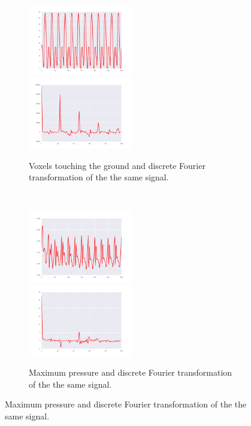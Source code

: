 \documentclass{sig-alternate}
\begin{document}
\begin{figure}[t!]
\begin{subfigure}[t]{0.23\textwidth}
\centering
\includegraphics[width=0.5\textwidth]{../Figures/Behaviors/vtg.pdf}~
\includegraphics[width=0.5\textwidth]{../Figures/Behaviors/vtgdft.pdf}
\caption{Voxels touching the ground and discrete Fourier transformation of the the same signal.}
\end{subfigure}\\
\begin{subfigure}[t]{0.23\textwidth}
\centering
\includegraphics[width=0.5\textwidth]{../Figures/Behaviors/pr.pdf}~
\includegraphics[width=0.5\textwidth]{../Figures/Behaviors/prdft.pdf}
\caption{Maximum pressure and discrete Fourier transformation of the the same signal.}

\end{subfigure}
\end{figure}
\end{document}
